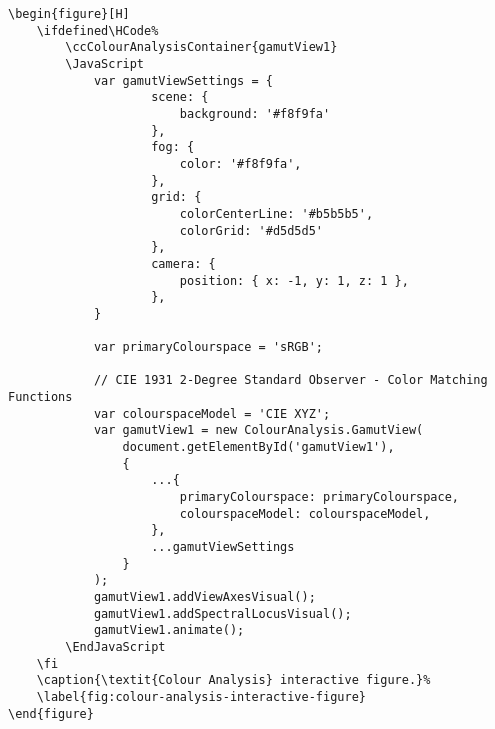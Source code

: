\begin{lstlisting}[caption={\textit{Colour Analysis} interactive figure.}]
\begin{figure}[H]
    \ifdefined\HCode%
        \ccColourAnalysisContainer{gamutView1}
        \JavaScript
            var gamutViewSettings = {
                    scene: {
                        background: '#f8f9fa'
                    },
                    fog: {
                        color: '#f8f9fa',
                    },
                    grid: {
                        colorCenterLine: '#b5b5b5',
                        colorGrid: '#d5d5d5'
                    },
                    camera: {
                        position: { x: -1, y: 1, z: 1 },
                    },
            }

            var primaryColourspace = 'sRGB';

            // CIE 1931 2-Degree Standard Observer - Color Matching Functions
            var colourspaceModel = 'CIE XYZ';
            var gamutView1 = new ColourAnalysis.GamutView(
                document.getElementById('gamutView1'),
                {
                    ...{
                        primaryColourspace: primaryColourspace,
                        colourspaceModel: colourspaceModel,
                    },
                    ...gamutViewSettings
                }
            );
            gamutView1.addViewAxesVisual();
            gamutView1.addSpectralLocusVisual();
            gamutView1.animate();
        \EndJavaScript
    \fi
    \caption{\textit{Colour Analysis} interactive figure.}%
    \label{fig:colour-analysis-interactive-figure}
\end{figure}
\end{lstlisting}

